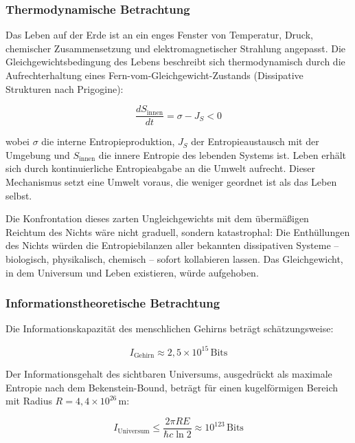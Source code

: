 ﻿\documentclass[12pt,a4paper]{report}
\begin{document}
\subsubsection{Thermodynamische Betrachtung}

Das Leben auf der Erde ist an ein enges Fenster von Temperatur, Druck, chemischer Zusammensetzung und elektromagnetischer Strahlung angepasst. Die Gleichgewichtsbedingung des Lebens beschreibt sich thermodynamisch durch die Aufrechterhaltung eines Fern-vom-Gleichgewicht-Zustands (Dissipative Strukturen nach Prigogine):

\begin{equation}
	\frac{dS_{\text{innen}}}{dt} = \sigma - J_S < 0
	\label{eq:dissipative_struktur}
\end{equation}

wobei $\sigma$ die interne Entropieproduktion, $J_S$ der Entropieaustausch mit der Umgebung und $S_{\text{innen}}$ die innere Entropie des lebenden Systems ist. Leben erhält sich durch kontinuierliche Entropieabgabe an die Umwelt aufrecht. Dieser Mechanismus setzt eine Umwelt voraus, die weniger geordnet ist als das Leben selbst.

Die Konfrontation dieses zarten Ungleichgewichts mit dem übermäßigen Reichtum des Nichts wäre nicht graduell, sondern katastrophal: Die Enthüllungen des Nichts würden die Entropiebilanzen aller bekannten dissipativen Systeme -- biologisch, physikalisch, chemisch -- sofort kollabieren lassen. Das Gleichgewicht, in dem Universum und Leben existieren, würde aufgehoben.

\subsubsection{Informationstheoretische Betrachtung}

Die Informationskapazität des menschlichen Gehirns beträgt schätzungsweise:

\begin{equation}
	I_{\text{Gehirn}} \approx 2{,}5 \times 10^{15}\,\text{Bits}
	\label{eq:gehirn_kapazitaet}
\end{equation}

Der Informationsgehalt des sichtbaren Universums, ausgedrückt als maximale Entropie nach dem Bekenstein-Bound, beträgt für einen kugelförmigen Bereich mit Radius $R = 4{,}4 \times 10^{26}\,\text{m}$:

\begin{equation}
	I_{\text{Universum}} \leq \frac{2\pi R E}{\hbar c \ln 2} \approx 10^{123}\,\text{Bits}
	\label{eq:universum_info}
\end{equation}
\end{document}
